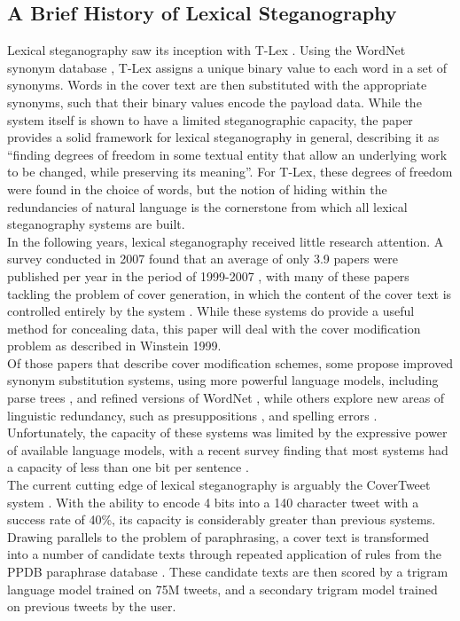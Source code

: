 \documentclass[12pt,a4paper]{article}
\begin{document}
\subsection{A Brief History of Lexical Steganography}
\noindent Lexical steganography saw its inception with T-Lex \cite{tlex}. Using the WordNet synonym database \cite{wordnet}, T-Lex assigns a unique binary value to each word in a set of synonyms. Words in the cover text are then substituted with the appropriate synonyms, such that their binary values encode the payload data. While the system itself is shown to have a limited steganographic capacity, the paper provides a solid framework for lexical steganography in general, describing it as ``finding degrees of freedom in some textual entity that allow an underlying work to be changed, while preserving its meaning''. For T-Lex, these degrees of freedom were found in the choice of words, but the notion of hiding within the redundancies of natural language is the cornerstone from which all lexical steganography systems are built.\\
\indent In the following years, lexical steganography received little research attention. A survey conducted in 2007 found that an average of only 3.9 papers were published per year in the period of 1999-2007 \cite{bib}, with many of these papers tackling the problem of cover generation, in which the content of the cover text is controlled entirely by the system \cite{nicetext2,lunabel}. While these systems do provide a useful method for concealing data, this paper will deal with the cover modification problem as described in Winstein 1999.\\
\indent Of those papers that describe cover modification schemes, some propose improved synonym substitution systems, using more powerful language models, including parse trees \cite{parsetree}, and refined versions of WordNet \cite{syn1,syn2}, while others explore new areas of linguistic redundancy, such as presuppositions \cite{presup}, and spelling errors \cite{errors}. Unfortunately, the capacity of these systems was limited by the expressive power of available language models, with a recent survey finding that most systems had a capacity of less than one bit per sentence  \cite{ngram}.\\
\indent The current cutting edge of lexical steganography is arguably the CoverTweet system \cite{covertweet1}. With the ability to encode 4 bits into a 140 character tweet with a success rate of 40\%, its capacity is considerably greater than previous systems. Drawing parallels to the problem of paraphrasing, a cover text is transformed into a number of candidate texts through repeated application of rules from the PPDB paraphrase database \cite{ppdb}. These candidate texts are then scored by a trigram language model trained on 75M tweets, and a secondary trigram model trained on previous tweets by the user. \\
\end{document}
